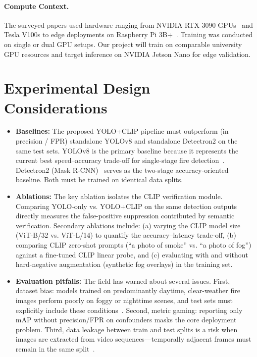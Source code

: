 \documentclass[11pt,twocolumn]{article}
\begin{document}
\paragraph{Compute Context.}
The surveyed papers used hardware ranging from NVIDIA RTX 3090 GPUs~\cite{firematch} and Tesla V100s to edge deployments on Raspberry Pi 3B+~\cite{detectron2fire}. Training was conducted on single or dual GPU setups. Our project will train on comparable university GPU resources and target inference on NVIDIA Jetson Nano for edge validation.

\section*{Experimental Design Considerations}
\label{sec:expdesign}

\begin{itemize}[leftmargin=*, itemsep=2pt]
    \item \textbf{Baselines:} The proposed YOLO+CLIP pipeline must outperform (in precision / FPR) standalone YOLOv8 and standalone Detectron2 on the same test sets. YOLOv8 is the primary baseline because it represents the current best speed--accuracy trade-off for single-stage fire detection~\cite{yolov8_smartcity}. Detectron2 (Mask R-CNN)~\cite{detectron2fire} serves as the two-stage accuracy-oriented baseline. Both must be trained on identical data splits.
    
    \item \textbf{Ablations:} The key ablation isolates the CLIP verification module. Comparing YOLO-only vs. YOLO+CLIP on the same detection outputs directly measures the false-positive suppression contributed by semantic verification. Secondary ablations include: (a) varying the CLIP model size (ViT-B/32 vs. ViT-L/14) to quantify the accuracy--latency trade-off, (b) comparing CLIP zero-shot prompts (``a photo of smoke'' vs. ``a photo of fog'') against a fine-tuned CLIP linear probe, and (c) evaluating with and without hard-negative augmentation (synthetic fog overlays) in the training set.
    
    \item \textbf{Evaluation pitfalls:} The field has warned about several issues. First, dataset bias: models trained on predominantly daytime, clear-weather fire images perform poorly on foggy or nighttime scenes, and test sets must explicitly include these conditions~\cite{detectron2fire}. Second, metric gaming: reporting only mAP without precision/FPR on confounders masks the core deployment problem. Third, data leakage between train and test splits is a risk when images are extracted from video sequences---temporally adjacent frames must remain in the same split~\cite{firematch}.
\end{itemize}
\end{document}
